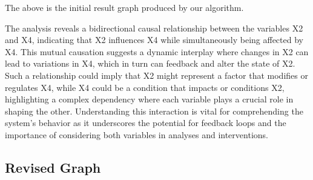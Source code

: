\documentclass{article}
\begin{document}
The above is the initial result graph produced by our algorithm.

The analysis reveals a bidirectional causal relationship between the variables X2 and X4, indicating that X2 influences X4 while simultaneously being affected by X4. This mutual causation suggests a dynamic interplay where changes in X2 can lead to variations in X4, which in turn can feedback and alter the state of X2. Such a relationship could imply that X2 might represent a factor that modifies or regulates X4, while X4 could be a condition that impacts or conditions X2, highlighting a complex dependency where each variable plays a crucial role in shaping the other. Understanding this interaction is vital for comprehending the system's behavior as it underscores the potential for feedback loops and the importance of considering both variables in analyses and interventions.

\subsection{Revised Graph}
\end{document}
